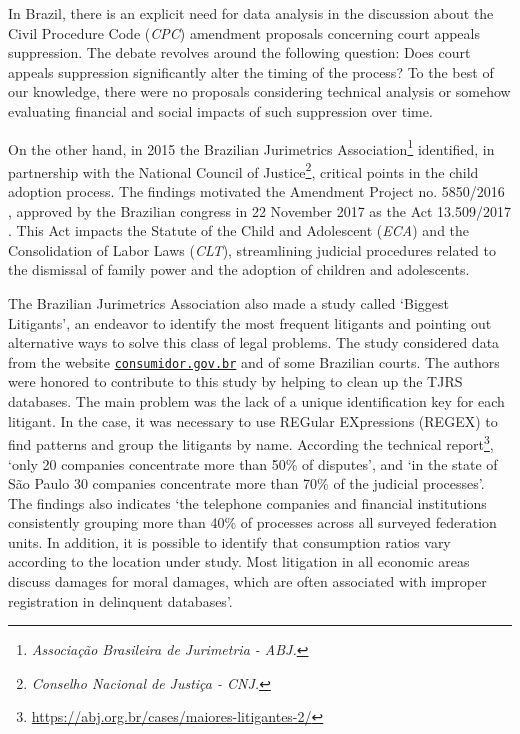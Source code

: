 \documentclass[a4paper]{exam}
\theoremstyle{plain}
\begin{document}
In Brazil, there is an explicit need for data analysis in the discussion about the Civil Procedure Code (\textit{CPC}) amendment proposals concerning court appeals suppression. The debate revolves around the following question: Does court appeals suppression significantly alter the timing of the process? To the best of our knowledge, there were no proposals considering technical analysis or somehow evaluating financial and social impacts of such suppression over time.

On the other hand, in 2015 the Brazilian Jurimetrics Association\footnote{\textit{Associação Brasileira de Jurimetria - ABJ.}} identified, in partnership with the National Council of Justice\footnote{\textit{Conselho Nacional de Justiça - CNJ.}}, critical points in the child adoption process. The findings motivated the Amendment Project no. 5850/2016 \cite{brasil2016projeto}, approved by the Brazilian congress in 22 November 2017 as the Act 13.509/2017 \cite{brasil2017lei}. This Act impacts the Statute of the Child and Adolescent (\textit{ECA}) and the Consolidation of Labor Laws (\textit{CLT}), streamlining judicial procedures related to the dismissal of family power and the adoption of children and adolescents.

The Brazilian Jurimetrics Association also made a study called `Biggest Litigants', an endeavor to identify the most frequent litigants and pointing out alternative ways to solve this class of legal problems. The study considered data from the website \href{https://www.consumidor.gov.br/}{\nolinkurl{consumidor.gov.br}} and of some Brazilian courts. The authors were honored to contribute to this study by helping to clean up the TJRS databases. The main problem was the lack of a unique identification key for each litigant. In the case, it was necessary to use REGular EXpressions (REGEX) to find patterns and group the litigants by name. According the technical report\footnote{\url{https://abj.org.br/cases/maiores-litigantes-2/}}, `only 20 companies concentrate more than 50\% of disputes', and `in the state of São Paulo 30 companies concentrate more than 70\% of the judicial processes'. The findings also indicates `the telephone companies and financial institutions consistently grouping more than 40\% of processes across all surveyed federation units. In addition, it is possible to identify that consumption ratios vary according to the location under study. Most litigation in all economic areas discuss damages for moral damages, which are often associated with improper registration in delinquent databases'.
\end{document}
